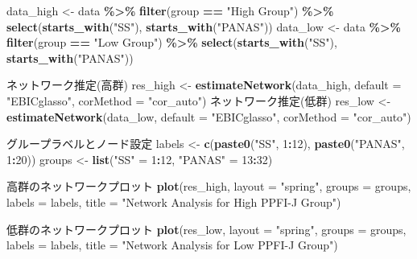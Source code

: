 \documentclass[12pt,a4paper,xelatex,ja=standard]{bxjsarticle}
\newenvironment{Shaded}{\begin{snugshade}}{\end{snugshade}}
\newcommand{\AttributeTok}[1]{\textcolor[rgb]{0.13,0.29,0.53}{#1}}
\newcommand{\DecValTok}[1]{\textcolor[rgb]{0.00,0.00,0.81}{#1}}
\newcommand{\FunctionTok}[1]{\textcolor[rgb]{0.13,0.29,0.53}{\textbf{#1}}}
\newcommand{\NormalTok}[1]{#1}
\newcommand{\OtherTok}[1]{\textcolor[rgb]{0.56,0.35,0.01}{#1}}
\newcommand{\SpecialCharTok}[1]{\textcolor[rgb]{0.81,0.36,0.00}{\textbf{#1}}}
\newcommand{\StringTok}[1]{\textcolor[rgb]{0.31,0.60,0.02}{#1}}
\begin{document}
\begin{Shaded}
\begin{Highlighting}[]
\NormalTok{data\_high }\OtherTok{\textless{}{-}}\NormalTok{ data }\SpecialCharTok{\%\textgreater{}\%} \FunctionTok{filter}\NormalTok{(group }\SpecialCharTok{==} \StringTok{"High Group"}\NormalTok{)}
\SpecialCharTok{\%\textgreater{}\%} \FunctionTok{select}\NormalTok{(}\FunctionTok{starts\_with}\NormalTok{(}\StringTok{"SS"}\NormalTok{), }\FunctionTok{starts\_with}\NormalTok{(}\StringTok{"PANAS"}\NormalTok{))}
\NormalTok{data\_low }\OtherTok{\textless{}{-}}\NormalTok{ data }\SpecialCharTok{\%\textgreater{}\%} \FunctionTok{filter}\NormalTok{(group }\SpecialCharTok{==} \StringTok{"Low Group"}\NormalTok{)}
\SpecialCharTok{\%\textgreater{}\%} \FunctionTok{select}\NormalTok{(}\FunctionTok{starts\_with}\NormalTok{(}\StringTok{"SS"}\NormalTok{), }\FunctionTok{starts\_with}\NormalTok{(}\StringTok{"PANAS"}\NormalTok{))}

\NormalTok{ネットワーク推定(高群)}
\NormalTok{res\_high }\OtherTok{\textless{}{-}} \FunctionTok{estimateNetwork}\NormalTok{(data\_high, }
                            \AttributeTok{default =} \StringTok{"EBICglasso"}\NormalTok{, }
                            \AttributeTok{corMethod =} \StringTok{"cor\_auto"}\NormalTok{)}
\NormalTok{ネットワーク推定(低群)}
\NormalTok{res\_low }\OtherTok{\textless{}{-}} \FunctionTok{estimateNetwork}\NormalTok{(data\_low, }
                           \AttributeTok{default =} \StringTok{"EBICglasso"}\NormalTok{, }
                           \AttributeTok{corMethod =} \StringTok{"cor\_auto"}\NormalTok{)}

\NormalTok{グループラベルとノード設定}
\NormalTok{labels }\OtherTok{\textless{}{-}} \FunctionTok{c}\NormalTok{(}\FunctionTok{paste0}\NormalTok{(}\StringTok{"SS"}\NormalTok{, }\DecValTok{1}\SpecialCharTok{:}\DecValTok{12}\NormalTok{), }\FunctionTok{paste0}\NormalTok{(}\StringTok{"PANAS"}\NormalTok{, }\DecValTok{1}\SpecialCharTok{:}\DecValTok{20}\NormalTok{))}
\NormalTok{groups }\OtherTok{\textless{}{-}} \FunctionTok{list}\NormalTok{(}\StringTok{"SS"} \OtherTok{=} \DecValTok{1}\SpecialCharTok{:}\DecValTok{12}\NormalTok{, }\StringTok{"PANAS"} \OtherTok{=} \DecValTok{13}\SpecialCharTok{:}\DecValTok{32}\NormalTok{)}

\NormalTok{高群のネットワークプロット}
\FunctionTok{plot}\NormalTok{(res\_high, }\AttributeTok{layout =} \StringTok{"spring"}\NormalTok{, }
     \AttributeTok{groups =}\NormalTok{ groups, }\AttributeTok{labels =}\NormalTok{ labels, }
     \AttributeTok{title =} \StringTok{"Network Analysis for High PPFI{-}J Group"}\NormalTok{)}

\NormalTok{低群のネットワークプロット}
\FunctionTok{plot}\NormalTok{(res\_low, }\AttributeTok{layout =} \StringTok{"spring"}\NormalTok{,}
     \AttributeTok{groups =}\NormalTok{ groups, }\AttributeTok{labels =}\NormalTok{ labels, }
     \AttributeTok{title =} \StringTok{"Network Analysis for Low PPFI{-}J Group"}\NormalTok{)}


\end{Highlighting}
\end{Shaded}
\end{document}
